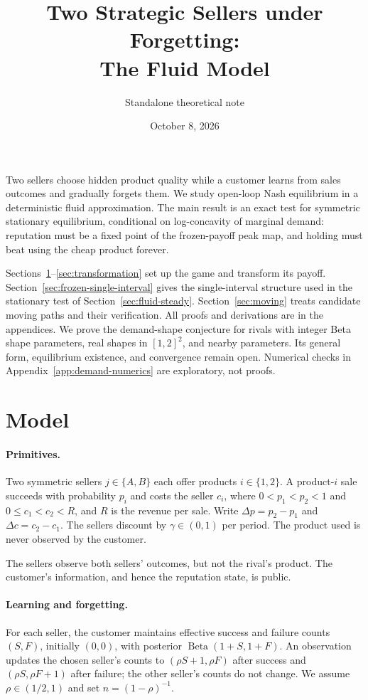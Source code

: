\documentclass[11pt]{article}
\title{Two Strategic Sellers under Forgetting:\\
The Fluid Model}
\author{Standalone theoretical note}
\date{October 8, 2026}
\DeclareMathOperator{\Beta}{Beta}
\theoremstyle{definition}
\begin{document}
\maketitle

Two sellers choose hidden product quality while a customer learns from
sales outcomes and gradually forgets them. We study open-loop Nash
equilibrium in a deterministic fluid approximation. The main result is an
exact test for symmetric stationary equilibrium, conditional on
log-concavity of marginal demand: reputation must be a fixed point of the
frozen-payoff peak map, and holding must beat using the cheap product
forever.

Sections~\ref{sec:model}--\ref{sec:transformation} set up the game and
transform its payoff. Section~\ref{sec:frozen-single-interval} gives the
single-interval structure used in the stationary test of
Section~\ref{sec:fluid-steady}. Section~\ref{sec:moving} treats candidate
moving paths and their verification. All proofs and derivations are in the
appendices. We prove the demand-shape conjecture for rivals with integer
Beta shape parameters, real shapes in $[1,2]^2$, and nearby parameters.
Its general form, equilibrium
existence, and convergence remain open. Numerical checks in
Appendix~\ref{app:demand-numerics} are exploratory, not proofs.

\section{Model}\label{sec:model}

\paragraph{Primitives.}
Two symmetric sellers $j\in\{A,B\}$ each offer products $i\in\{1,2\}$. A
product-$i$ sale succeeds with probability $p_i$ and costs the seller $c_i$,
where $0<p_1<p_2<1$ and $0\leq c_1<c_2<R$, and $R$ is the revenue per sale.
Write $\Delta p=p_2-p_1$ and $\Delta c=c_2-c_1$. The sellers discount by
$\gamma\in(0,1)$ per period. The product used is never observed by the
customer.

The sellers observe both sellers' outcomes, but not the rival's product.
The customer's information, and hence the reputation state, is public.

\paragraph{Learning and forgetting.}
For each seller, the customer maintains effective success and failure
counts $(S,F)$, initially $(0,0)$, with posterior $\Beta(1+S,1+F)$.
An observation updates the chosen seller's counts to $(\rho S+1,\rho F)$
after success and $(\rho S,\rho F+1)$ after failure; the other seller's
counts do not change. We assume $\rho\in(1/2,1)$ and set $n=(1-\rho)^{-1}$.
\end{document}
